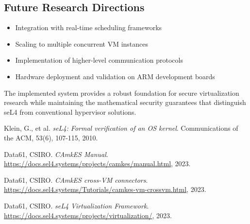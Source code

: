 \documentclass[12pt,a4paper]{article}
\begin{document}
\subsection{Future Research Directions}

\begin{itemize}
\item Integration with real-time scheduling frameworks
\item Scaling to multiple concurrent VM instances
\item Implementation of higher-level communication protocols
\item Hardware deployment and validation on ARM development boards
\end{itemize}

The implemented system provides a robust foundation for secure virtualization research while maintaining the mathematical security guarantees that distinguish seL4 from conventional hypervisor solutions.


\begin{thebibliography}{9}

Klein, G., et al.
\textit{seL4: Formal verification of an OS kernel}.
Communications of the ACM, 53(6), 107-115, 2010.

Data61, CSIRO.
\textit{CAmkES Manual}.
\url{https://docs.sel4.systems/projects/camkes/manual.html}, 2023.

Data61, CSIRO.
\textit{CAmkES cross-VM connectors}.
\url{https://docs.sel4.systems/Tutorials/camkes-vm-crossvm.html}, 2023.

Data61, CSIRO.
\textit{seL4 Virtualization Framework}.
\url{https://docs.sel4.systems/projects/virtualization/}, 2023.

\end{thebibliography}
\end{document}
